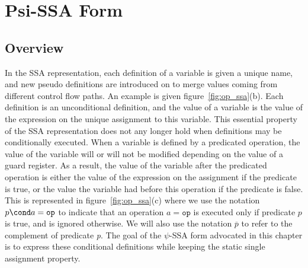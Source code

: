 \chapter{Psi-SSA Form }
\label{chapter:psi_ssa}

\section{Overview}



In the SSA representation, each definition of a variable is given a
unique name, and new pseudo definitions are introduced on \phifuns to merge values coming from different control flow paths. An
example is given figure~\ref{fig:op_ssa}(b). Each definition is an
unconditional definition, and the value of a variable is the value of
the expression on the unique assignment to this variable. This
essential property of the SSA representation does not any longer hold
when definitions may be conditionally executed. When a variable is defined by a predicated operation, the value of the variable
will or will not be modified depending on the value of a guard
register. As a result, the value of the variable after the predicated
operation is either the value of the expression on the assignment if
the predicate is true, or the value the variable had before this
operation if the predicate is false. This is represented in
figure~\ref{fig:op_ssa}(c) where we use the notation $p\cond a = \texttt{op}$ to indicate that an operation $a = \texttt{op}$ is executed only if predicate $p$ is true, and is ignored otherwise. We will also use the notation $\overline{{p}}$ to refer to the complement of predicate \textit{p}.
The goal of the $\psi$-SSA form advocated in this chapter is to express these conditional definitions while keeping the static single assignment property.

